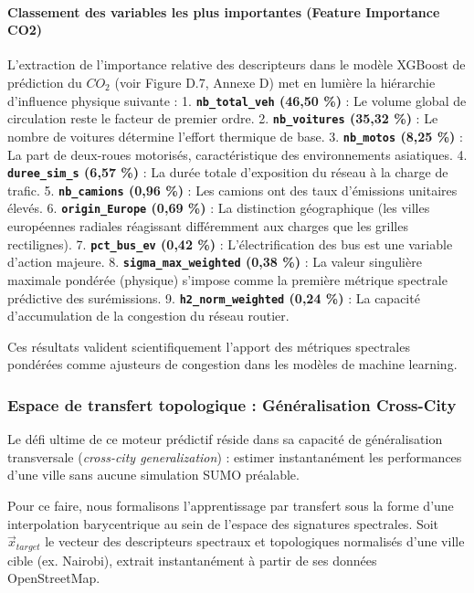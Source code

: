 \documentclass[11pt, a4paper]{article}
\begin{document}
\paragraph{Classement des variables les plus importantes (Feature
Importance
CO2)}\label{classement-des-variables-les-plus-importantes-feature-importance-co2}

L'extraction de l'importance relative des descripteurs dans le modèle
XGBoost de prédiction du \(CO_2\) (voir Figure D.7, Annexe D) met en
lumière la hiérarchie d'influence physique suivante : 1.
\textbf{\texttt{nb\_total\_veh} (46,50 \%)} : Le volume global de
circulation reste le facteur de premier ordre. 2.
\textbf{\texttt{nb\_voitures} (35,32 \%)} : Le nombre de voitures
détermine l'effort thermique de base. 3. \textbf{\texttt{nb\_motos}
(8,25 \%)} : La part de deux-roues motorisés, caractéristique des
environnements asiatiques. 4. \textbf{\texttt{duree\_sim\_s} (6,57 \%)}
: La durée totale d'exposition du réseau à la charge de trafic. 5.
\textbf{\texttt{nb\_camions} (0,96 \%)} : Les camions ont des taux
d'émissions unitaires élevés. 6. \textbf{\texttt{origin\_Europe} (0,69
\%)} : La distinction géographique (les villes européennes radiales
réagissant différemment aux charges que les grilles rectilignes). 7.
\textbf{\texttt{pct\_bus\_ev} (0,42 \%)} : L'électrification des bus est
une variable d'action majeure. 8. \textbf{\texttt{sigma\_max\_weighted}
(0,38 \%)} : La valeur singulière maximale pondérée (physique) s'impose
comme la première métrique spectrale prédictive des surémissions. 9.
\textbf{\texttt{h2\_norm\_weighted} (0,24 \%)} : La capacité
d'accumulation de la congestion du réseau routier.

Ces résultats valident scientifiquement l'apport des métriques
spectrales pondérées comme ajusteurs de congestion dans les modèles de
machine learning.

\subsubsection{Espace de transfert topologique : Généralisation
Cross-City}\label{espace-de-transfert-topologique-guxe9nuxe9ralisation-cross-city}

Le défi ultime de ce moteur prédictif réside dans sa capacité de
généralisation transversale (\emph{cross-city generalization}) : estimer
instantanément les performances d'une ville sans aucune simulation SUMO
préalable.

Pour ce faire, nous formalisons l'apprentissage par transfert sous la
forme d'une interpolation barycentrique au sein de l'espace des
signatures spectrales. Soit \(\vec{x}_{target}\) le vecteur des
descripteurs spectraux et topologiques normalisés d'une ville cible (ex.
Nairobi), extrait instantanément à partir de ses données OpenStreetMap.
\end{document}
